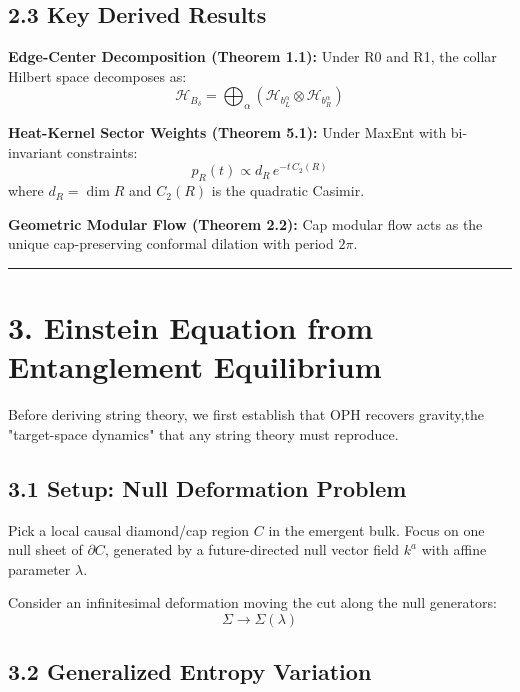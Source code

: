 \subsection{2.3 Key Derived Results}\label{23-key-derived-results}

\textbf{Edge-Center Decomposition (Theorem 1.1):} Under R0 and R1, the collar Hilbert space decomposes as: \[\mathcal{H}_{B_\delta} = \bigoplus_{\alpha} \left(\mathcal{H}_{b_L^\alpha} \otimes \mathcal{H}_{b_R^\alpha}\right)\]

\textbf{Heat-Kernel Sector Weights (Theorem 5.1):} Under MaxEnt with bi-invariant constraints: \[p_R(t) \propto d_R \, e^{-t \, C_2(R)}\] where \(d_R = \dim R\) and \(C_2(R)\) is the quadratic Casimir.

\textbf{Geometric Modular Flow (Theorem 2.2):} Cap modular flow acts as the unique cap-preserving conformal dilation with period \(2\pi\).

\begin{center}\rule{0.5\linewidth}{0.5pt}\end{center}

\section{3. Einstein Equation from Entanglement Equilibrium}\label{3-einstein-equation-from-entanglement-equilibrium}

Before deriving string theory, we first establish that OPH recovers gravity,the "target-space dynamics" that any string theory must reproduce.

\subsection{3.1 Setup: Null Deformation Problem}\label{31-setup-null-deformation-problem}

Pick a local causal diamond/cap region \(C\) in the emergent bulk. Focus on one null sheet of \(\partial C\), generated by a future-directed null vector field \(k^a\) with affine parameter \(\lambda\).

Consider an infinitesimal deformation moving the cut along the null generators: \[\Sigma \to \Sigma(\lambda)\]

\subsection{3.2 Generalized Entropy Variation}\label{32-generalized-entropy-variation}


